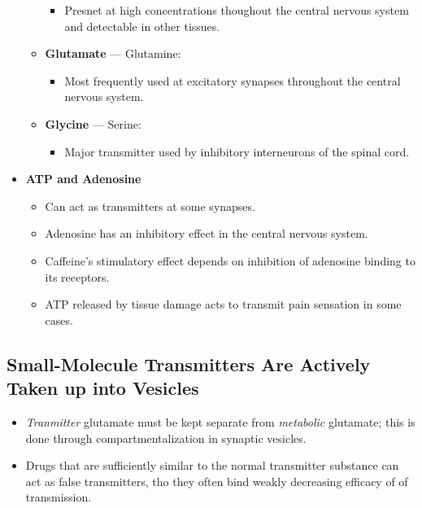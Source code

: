 \documentclass[12pt,a4paper]{article}
\begin{document}
\begin{itemize}
\begin{itemize}
\begin{itemize}
                        \item Presnet at high concentrations thoughout the central nervous system and detectable in other tissues.
                    \end{itemize}
                \item \textbf{Glutamate} --- Glutamine:
                \begin{itemize}
                    \item Most frequently used at excitatory synapses throughout the central nervous system.
                \end{itemize}
                \item \textbf{Glycine} --- Serine:
                    \begin{itemize}
                        \item Major transmitter used by inhibitory interneurons of the spinal cord.
                    \end{itemize}
            \end{itemize}
        \item \textbf{ATP and Adenosine}
            \begin{itemize}
                \item Can act as transmitters at some synapses.
                \item Adenosine has an inhibitory effect in the central nervous system.
                \item Caffeine's stimulatory effect depends on inhibition of adenosine binding to its receptors.
                \item ATP released by tissue damage acts to transmit pain sensation in some cases.
            \end{itemize}
\end{itemize}

\subsection{Small-Molecule Transmitters Are Actively Taken up into Vesicles}
\begin{itemize}
    \item \textit{Tranmitter} glutamate must be kept separate from \textit{metabolic} glutamate; this is done through compartmentalization in synaptic vesicles.
    \item Drugs that are sufficiently similar to the normal transmitter substance can act as false transmitters, tho they often bind weakly decreasing efficacy of of transmission.
\end{itemize}
\end{document}

